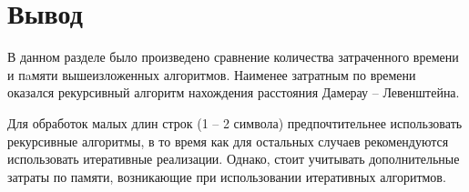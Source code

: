     \section*{Вывод}
    
        В данном разделе было произведено сравнение количества затраченного времени и пaмяти вышеизложенных алгоритмов. Наименее затратным по времени оказался рекурсивный алгоритм нахождения расстояния Дамерау – Левенштейна.
        
        Для обработок малых длин строк (1 – 2 символа) предпочтительнее использовать рекурсивные алгоритмы, в то время как для остальных случаев рекомендуются использовать итеративные реализации. Однако, стоит учитывать дополнительные затраты по памяти, возникающие при использовании итеративных алгоритмов.